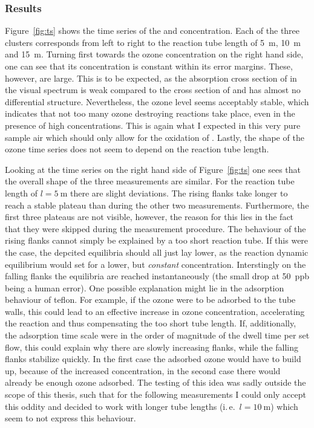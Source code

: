 \subsubsection{Results}
\label{sec:no-results}

Figure~\ref{fig:ts} shows the time series of the  and 
concentration. Each of the three clusters corresponds from left to
right to the reaction tube length of \SI{5}{\meter}, \SI{10}{\meter}
and \SI{15}{\meter}. Turning first towards the ozone concentration on
the right hand side, one can see that its concentration is constant within
its error margins. These, however, are large. This is to be expected,
as the absorption cross section of  in the visual spectrum is
weak compared to the cross section of  and has almost no
differential structure. Nevertheless, the ozone level seems acceptably
stable, which indicates that not too many ozone destroying reactions
take place, even in the presence of high  concentrations. This
is again what I expected in this very pure sample air which should
only allow for the oxidation of . Lastly, the shape of the ozone
time series does not seem to depend on the reaction tube length.

Looking at the  time series on the right hand side of
Figure~\ref{fig:ts} one sees that the overall shape of the three
measurements are similar. For the reaction tube length of
$l= \SI{5}{\meter}$ there are slight deviations. The rising flanks take
longer to reach a stable plateau than during the other two
measurements. Furthermore, the first three plateaus are not visible,
however, the reason for this lies in the fact that they were skipped
during the measurement procedure. The behaviour of the rising flanks
cannot simply be explained by a too short reaction tube. If this were
the case, the depcited equilibria should all just lay lower, as the
reaction dynamic equilibrium would set for a lower, but
\emph{constant}  concentration. Interstingly on the falling
flanks the equilibria are reached instantaneously (the small drop at
\SI{50}{ppb} being a human error). One possible explanation might lie
in the adsorption behaviour of teflon. For example, if the ozone were
to be adsorbed to the tube walls, this could lead to an effective
increase in ozone concentration, accelerating the reaction and thus
compensating the too short tube length. If, additionally, the
adsorption time scale were in the order of magnitude of the dwell time
per set flow, this could explain why there are slowly increasing flanks,
while the falling flanks stabilize quickly. In the first case the
adsorbed ozone would have to build up, because of the increased
concentration, in the second case there would already be enough ozone
adsorbed. The testing of this idea was sadly outside the scope of this
thesis, such that for the following measurements I could only accept
this oddity and decided to work with longer tube lengths
(i.\,e.~$l = \SI{10}{\meter}$) which seem to not express this
behaviour.


